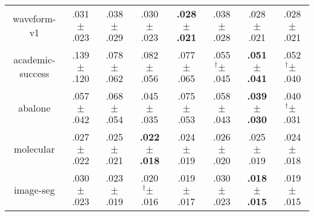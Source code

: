 \begin{tabular}{|c|ccccccc|}
waveform-v1 & .031$^{\phantom{\dag}}\pm^{\phantom{\dag}}$.023\cellcolor{green!15} & .038$^{\phantom{\dag}}\pm^{\phantom{\dag}}$.029\cellcolor{red!38} & .030$^{\phantom{\dag}}\pm^{\phantom{\dag}}$.023\cellcolor{green!17} & \textbf{.028$^{\phantom{\dag}}\pm^{\phantom{\dag}}$.021}\cellcolor{green!40} & .038$^{\phantom{\dag}}\pm^{\phantom{\dag}}$.028\cellcolor{red!40} & .028$^{\phantom{\dag}}\pm^{\phantom{\dag}}$.021\cellcolor{green!36} & .028$^{\phantom{\dag}}\pm^{\phantom{\dag}}$.021\cellcolor{green!37} \\
academic-success & .139$^{\phantom{\dag}}\pm^{\phantom{\dag}}$.120\cellcolor{red!40} & .078$^{\phantom{\dag}}\pm^{\phantom{\dag}}$.062\cellcolor{green!15} & .082$^{\phantom{\dag}}\pm^{\phantom{\dag}}$.056\cellcolor{green!12} & .077$^{\phantom{\dag}}\pm^{\phantom{\dag}}$.065\cellcolor{green!16} & .055$^{\dag}\pm^{\phantom{\dag}}$.045\cellcolor{green!36} & \textbf{.051$^{\phantom{\dag}}\pm^{\phantom{\dag}}$.041}\cellcolor{green!40} & .052$^{\dag}\pm^{\phantom{\dag}}$.040\cellcolor{green!39} \\
abalone & .057$^{\phantom{\dag}}\pm^{\phantom{\dag}}$.042\cellcolor{red!0} & .068$^{\phantom{\dag}}\pm^{\phantom{\dag}}$.054\cellcolor{red!24} & .045$^{\phantom{\dag}}\pm^{\phantom{\dag}}$.035\cellcolor{green!25} & .075$^{\phantom{\dag}}\pm^{\phantom{\dag}}$.053\cellcolor{red!40} & .058$^{\phantom{\dag}}\pm^{\phantom{\dag}}$.043\cellcolor{red!2} & \textbf{.039$^{\phantom{\dag}}\pm^{\phantom{\dag}}$.030}\cellcolor{green!40} & .040$^{\dag}\pm^{\phantom{\dag}}$.031\cellcolor{green!36} \\
molecular & .027$^{\phantom{\dag}}\pm^{\phantom{\dag}}$.022\cellcolor{red!40} & .025$^{\phantom{\dag}}\pm^{\phantom{\dag}}$.021\cellcolor{red!12} & \textbf{.022$^{\phantom{\dag}}\pm^{\phantom{\dag}}$.018}\cellcolor{green!40} & .024$^{\phantom{\dag}}\pm^{\phantom{\dag}}$.019\cellcolor{green!5} & .026$^{\phantom{\dag}}\pm^{\phantom{\dag}}$.020\cellcolor{red!20} & .025$^{\phantom{\dag}}\pm^{\phantom{\dag}}$.019\cellcolor{red!2} & .024$^{\phantom{\dag}}\pm^{\phantom{\dag}}$.018\cellcolor{green!16} \\
image-seg & .030$^{\phantom{\dag}}\pm^{\phantom{\dag}}$.023\cellcolor{red!40} & .023$^{\phantom{\dag}}\pm^{\phantom{\dag}}$.019\cellcolor{green!8} & .020$^{\dag}\pm^{\phantom{\dag}}$.016\cellcolor{green!31} & .019$^{\phantom{\dag}}\pm^{\phantom{\dag}}$.017\cellcolor{green!31} & .030$^{\phantom{\dag}}\pm^{\phantom{\dag}}$.023\cellcolor{red!36} & \textbf{.018$^{\phantom{\dag}}\pm^{\phantom{\dag}}$.015}\cellcolor{green!40} & .019$^{\phantom{\dag}}\pm^{\phantom{\dag}}$.015\cellcolor{green!32} \\

\end{tabular}

